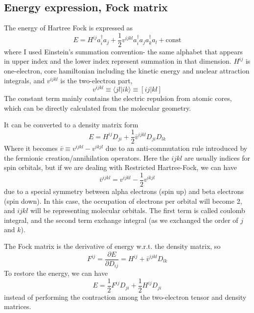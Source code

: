 \documentclass[12pt,a4paper,openany,twoside]{article}
\numberwithin{equation}{section}
\begin{document}
\subsection{Energy expression, Fock matrix}
The energy of Hartree Fock is expressed as
\begin{equation}
   E = H^{ij} a_i^\dagger a_j + \frac{1}{2} v^{ijkl} a_i^\dagger a_j a_k^\dagger a_l + \text{const}
\end{equation}
where I used Einstein's summation convention- the same alphabet that appears in upper index and the lower index represent summation in that dimension. $H^{ij}$ is one-electron, core hamiltonian including the kinetic energy and nuclear attraction integrals, and $v^{ijkl}$ is the two-electron part,
\begin{equation}
    v^{ijkl} \equiv \langle jl | ik \rangle \equiv [ij | kl]
\end{equation}
The constant term mainly contains the electric repulsion from atomic cores, which can be directly calculated from the molecular geometry.

It can be converted to a density matrix form
\begin{equation}
    E = H^{ij} D_{ji} + \frac{1}{2} \bar{v}^{ijkl} D_{ji} D_{lk}
\end{equation}
Where it becomes $\bar{v} \equiv v^{ijkl} - v^{ikjl}$ due to an anti-commutation rule introduced by the fermionic creation/annihilation operators. Here the $ijkl$ are usually indices for spin orbitals, but if we are dealing with Restricted Hartree-Fock, we can have 
\begin{equation}
    \bar{v}^{ijkl} = v^{ijkl} - \frac{1}{2} v^{ikjl}
\end{equation}
due to a special symmetry between alpha electrons (spin up) and beta electrons (spin down). In this case, the occupation of electrons per orbital will become 2, and $ijkl$ will be representing molecular orbitals. The first term is called coulomb integral, and the second term exchange integral (as we exchanged the order of $j$ and $k$).

The Fock matrix is the derivative of energy w.r.t. the density matrix, so 
\begin{equation}
    F^{ij} = \frac{\partial E }{\partial D_{ij}} = H^{ij} + \bar{v}^{ijkl} D_{lk}
\end{equation}
To restore the energy, we can have
\begin{equation}
    E = \frac{1}{2} F^{ij} D_{ji} + \frac{1}{2} H^{ij} D_{ji}
\end{equation}
instead of performing the contraction among the two-electron tensor and density matrices.
\end{document}
